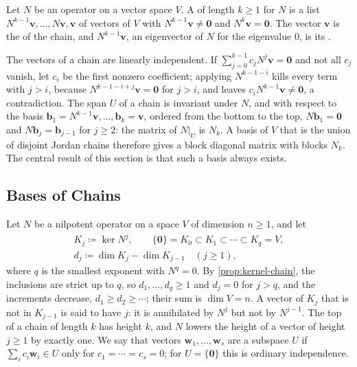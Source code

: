 \begin{definition}
\label{def:jordan-chain}
Let $N$ be an operator on a vector space $V$. A  of length $k\ge1$ for $N$ is a list $N^{k-1}\mathbf v,\ldots,N\mathbf v,\mathbf v$ of vectors of $V$ with $N^{k-1}\mathbf v\ne\mathbf 0$ and $N^k\mathbf v=\mathbf 0$. The vector $\mathbf v$ is the  of the chain, and $N^{k-1}\mathbf v$, an eigenvector of $N$ for the eigenvalue $0$, is its .
\end{definition}

The vectors of a chain are linearly independent. If $\sum_{j=0}^{k-1}c_jN^j\mathbf v=\mathbf 0$ and not all $c_j$ vanish, let $c_i$ be the first nonzero coefficient; applying $N^{k-1-i}$ kills every term with $j>i$, because $N^{k-1-i+j}\mathbf v=\mathbf 0$ for $j>i$, and leaves $c_iN^{k-1}\mathbf v\ne\mathbf 0$, a contradiction. The span $U$ of a chain is invariant under $N$, and with respect to the basis $\mathbf b_1=N^{k-1}\mathbf v,\ldots,\mathbf b_k=\mathbf v$, ordered from the bottom to the top, $N\mathbf b_1=\mathbf 0$ and $N\mathbf b_j=\mathbf b_{j-1}$ for $j\ge2$: the matrix of $N|_U$ is $N_k$. A basis of $V$ that is the union of disjoint Jordan chains therefore gives a block diagonal matrix with blocks $N_k$. The central result of this section is that such a basis always exists.

\subsection{Bases of Chains}

Let $N$ be a nilpotent operator on a space $V$ of dimension $n\ge1$, and let
\[
\begin{gathered}
K_j\coloneqq\ker N^j,\qquad\{\mathbf 0\}=K_0\subset K_1\subset\cdots\subset K_q=V,\\
d_j\coloneqq\dim K_j-\dim K_{j-1}\quad(j\ge1),
\end{gathered}
\]
where $q$ is the smallest exponent with $N^q=0$. By \cref{prop:kernel-chain}, the inclusions are strict up to $q$, so $d_1,\ldots,d_q\ge1$ and $d_j=0$ for $j>q$, and the increments decrease, $d_1\ge d_2\ge\cdots$; their sum is $\dim V=n$. A vector of $K_j$ that is not in $K_{j-1}$ is said to have  $j$: it is annihilated by $N^j$ but not by $N^{j-1}$. The top of a chain of length $k$ has height $k$, and $N$ lowers the height of a vector of height $j\ge1$ by exactly one. We say that vectors $\mathbf w_1,\ldots,\mathbf w_s$ are  a subspace $U$ if $\sum_ic_i\mathbf w_i\in U$ only for $c_1=\cdots=c_s=0$; for $U=\{\mathbf 0\}$ this is ordinary independence.

